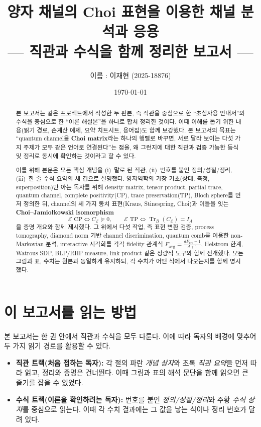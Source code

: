 \documentclass[11pt,a4paper]{article}
\title{\textbf{양자 채널의 Choi 표현을 이용한 채널 분석과 응용\\[5pt]
\large{--- 직관과 수식을 함께 정리한 보고서 ---}}}
\author{이름 : 이재현 (2025-18876)}
\date{\today}
\newcommand{\E}{\mathcal{E}}
\newcommand{\Tr}{\operatorname{Tr}}
\theoremstyle{definition}
\theoremstyle{plain}
\theoremstyle{remark}
\begin{document}
\maketitle

\begin{abstract}
본 보고서는 같은 프로젝트에서 작성한 두 판본, 즉 직관을 중심으로 한 ``초심자용 안내서''와 수식을 중심으로 한 ``이론 해설본''을 하나로 합쳐 정리한 것이다. 이때 이해를 돕기 위한 내용(읽기 경로, 손계산 예제, 요약 치트시트, 용어집)도 함께 보강했다. 본 보고서의 목표는 ``quantum channel을 \textbf{Choi matrix}라는 하나의 행렬로 바꾸면, 서로 달라 보이는 다섯 가지 주제가 모두 같은 언어로 연결된다''는 점을, 왜 그런지에 대한 직관과 검증 가능한 등식 및 정리로 동시에 확인하는 것이라고 할 수 있다.

이를 위해 본문은 모든 핵심 개념을 (i)~말로 된 직관, (ii)~번호를 붙인 정의/성질/정리, (iii)~한 줄 수식 요약의 세 겹으로 설명했다. 양자역학의 가장 기초(상태, 측정, superposition)만 아는 독자를 위해 density matrix, tensor product, partial trace, quantum channel, complete positivity(CP), trace preservation(TP), Bloch sphere를 먼저 정의한 뒤, channel의 세 가지 동치 표현(Kraus, Stinespring, Choi)과 이들을 잇는 \textbf{Choi--Jamio{\l}kowski isomorphism}
\[
\E\text{ CP}\iff C_\E\succeq0,\qquad \E\text{ TP}\iff \Tr_B(C_\E)=I_A
\]
을 증명 개요와 함께 제시했다. 그 위에서 다섯 작업, 즉 표현 변환 검증, process tomography, diamond norm 기반 channel discrimination, quantum comb를 이용한 non-Markovian 분석, interactive 시각화를 각각 fidelity 관계식 $F_{\mathrm{avg}}=\frac{dF_{\mathrm{pro}}+1}{d+1}$, Helstrom 한계, Watrous SDP, BLP/RHP measure, link product 같은 정량적 도구와 함께 전개했다. 모든 그림과 표, 수치는 원본과 동일하게 유지하되, 각 수치가 어떤 식에서 나오는지를 함께 명시했다.
\end{abstract}

\tableofcontents
\newpage

\section{이 보고서를 읽는 방법}

본 보고서는 한 권 안에서 직관과 수식을 모두 다룬다. 이에 따라 독자의 배경에 맞추어 두 가지 읽기 경로를 활용할 수 있다.

\begin{itemize}
  \item \textbf{직관 트랙(처음 접하는 독자):} 각 절의 파란 \emph{개념 상자}와 초록 \emph{직관 요약}을 먼저 따라 읽고, 정리와 증명은 건너뛴다. 이때 그림과 표의 해석 문단을 함께 읽으면 큰 줄기를 잡을 수 있었다.
  \item \textbf{수식 트랙(이론을 확인하려는 독자):} 번호를 붙인 \emph{정의/성질/정리}와 주황 \emph{수식 상자}를 중심으로 읽는다. 이때 각 수치 결과에는 그 값을 낳는 식이나 정리 번호가 달려 있다.
\end{itemize}
\end{document}
